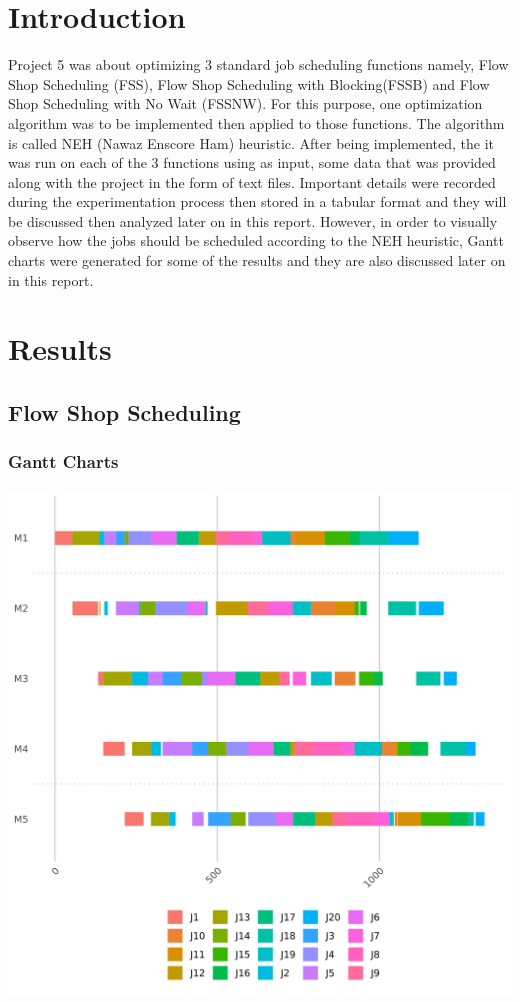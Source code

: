 \documentclass[12pt]{article}
\begin{document}
	\section{Introduction}
	Project 5 was about optimizing 3 standard job scheduling functions namely, Flow Shop Scheduling (FSS), Flow Shop Scheduling with Blocking(FSSB) and Flow Shop Scheduling with No Wait (FSSNW). For this purpose, one optimization algorithm was to be implemented then applied to those functions. The algorithm is called NEH (Nawaz Enscore Ham) heuristic. After being implemented, the it was run on each of the 3 functions using as input, some data that was provided along with the project in the form of text files. Important details were recorded during the experimentation process then stored in a tabular format and they will be discussed then analyzed later on in this report. However, in order to visually observe how the jobs should be scheduled according to the NEH heuristic, Gantt charts were generated for some of the results and they are also discussed later on in this report.
	
		
	\section{Results}
		\subsection{Flow Shop Scheduling}
			\subsubsection{Gantt Charts}
				\includegraphics[width=\linewidth]{5_20_GC_1.png}
				
\end{document}
